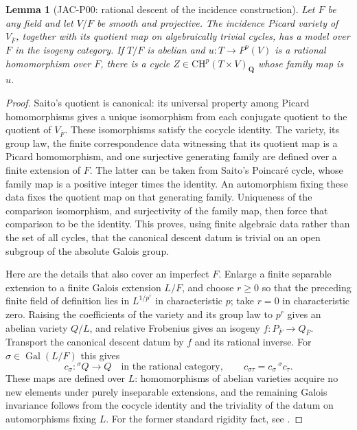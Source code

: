 \documentclass[11pt,a4paper]{article}
\newtheorem{lemma}[theorem]{Lemma}
\begin{document}
\begin{lemma}[JAC-P00: rational descent of the incidence construction]
\label{jac:P00}
Let $F$ be any field and let $V/F$ be smooth and projective.  The
incidence Picard variety of $V_{\overline F}$, together with its quotient
map on algebraically trivial cycles, has a model over $F$ in the isogeny
category.  If $T/F$ is abelian and $u:T\to P^p(V)$ is a rational
homomorphism over $F$, there is a cycle
$Z\in\mathrm{CH}^p(T\times V)_{\mathbf Q}$ whose family map is $u$.
\end{lemma}

\begin{proof}
Saito's quotient is canonical: its universal property among Picard
homomorphisms gives a unique isomorphism from each conjugate quotient
to the quotient of $V_{\overline F}$.  These isomorphisms satisfy the
cocycle identity.  The variety, its group law, the finite correspondence
data witnessing that its quotient map is a Picard homomorphism, and
one surjective generating family are defined over a finite extension
of $F$.  The latter can be taken from Saito's Poincar\'e cycle, whose
family map is a positive integer times the identity.  An automorphism
fixing these data fixes the quotient map on that generating family.
Uniqueness of the comparison isomorphism, and surjectivity of the
family map, then force that comparison to be the identity.  This
proves, using finite algebraic data rather than the set of all cycles,
that the canonical descent datum is trivial on an open subgroup of
the absolute Galois group.

Here are the details that also cover an imperfect $F$.  Enlarge a
finite separable extension to a finite Galois extension $L/F$, and
choose $r\ge0$ so that the preceding finite field of definition lies
in $L^{1/p^r}$ in characteristic $p$; take $r=0$ in characteristic
zero.  Raising the coefficients of the variety and its group law to
$p^r$ gives an abelian variety $Q/L$, and relative Frobenius gives an
isogeny $f:P_{\overline F}\to Q_{\overline F}$.
Transport the canonical descent datum by $f$ and its rational inverse.
For $\sigma\in\operatorname{Gal}(L/F)$ this gives
\[
 c_\sigma:{}^\sigma Q\longrightarrow Q
 \quad\text{in the rational category},\qquad
 c_{\sigma\tau}=c_\sigma\,{}^\sigma c_\tau.
\]
These maps are defined over $L$: homomorphisms of abelian varieties
acquire no new elements under purely inseparable extensions, and the
remaining Galois invariance follows from the cocycle identity and the
triviality of the datum on automorphisms fixing $L$.  For the former
standard rigidity fact, see \cite[Example~4.2.14, p.~38]{ConradAV}.


\end{proof}
\end{document}
